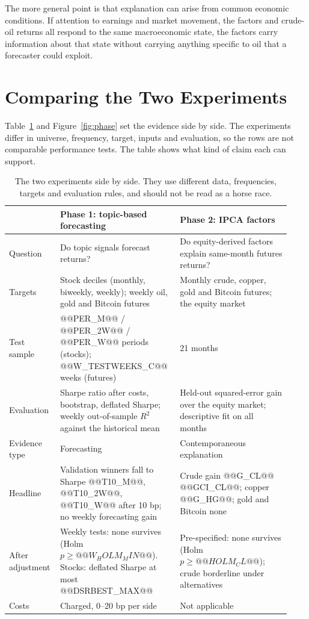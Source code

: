 \documentclass[11pt]{article}
\begin{document}
The more general point is that explanation can arise from common economic conditions. If attention to earnings and market movement, the factors and crude-oil returns all respond to the same macroeconomic state, the factors carry information about that state without carrying anything specific to oil that a forecaster could exploit.

\section{Comparing the Two Experiments}
\label{sec:compare}

Table~\ref{tab:compare} and Figure~\ref{fig:phase} set the evidence side by side. The experiments differ in universe, frequency, target, inputs and evaluation, so the rows are not comparable performance tests. The table shows what kind of claim each can support.

\begin{table}[t]
\centering\footnotesize
\begin{tabular}{@{}p{0.15\linewidth}p{0.40\linewidth}p{0.38\linewidth}@{}}
\toprule
 & Phase 1: topic-based forecasting & Phase 2: IPCA factors \\
\midrule
Question & Do topic signals forecast returns? & Do equity-derived factors explain same-month futures returns? \\
Targets & Stock deciles (monthly, biweekly, weekly); weekly oil, gold and Bitcoin futures & Monthly crude, copper, gold and Bitcoin futures; the equity market \\
Test sample & @@PER_M@@ / @@PER_2W@@ / @@PER_W@@ periods (stocks); @@W_TESTWEEKS_C@@ weeks (futures) & 21 months \\
Evaluation & Sharpe ratio after costs, bootstrap, deflated Sharpe; weekly out-of-sample $R^2$ against the historical mean & Held-out squared-error gain over the equity market; descriptive fit on all months \\
Evidence type & Forecasting & Contemporaneous explanation \\
Headline & Validation winners fall to Sharpe @@T10_M@@, @@T10_2W@@, @@T10_W@@ after 10 bp; no weekly forecasting gain & Crude gain @@G_CL@@ @@GCI_CL@@; copper @@G_HG@@; gold and Bitcoin none \\
After adjustment & Weekly tests: none survives (Holm $p\geq @@W_HOLM_MIN@@$). Stocks: deflated Sharpe at most @@DSRBEST_MAX@@ & Pre-specified: none survives (Holm $p\geq @@HOLM_CL@@$); crude borderline under alternatives \\
Costs & Charged, 0--20 bp per side & Not applicable \\
\bottomrule
\end{tabular}
\caption{The two experiments side by side. They use different data, frequencies, targets and evaluation rules, and should not be read as a horse race.}
\label{tab:compare}
\end{table}
\end{document}
